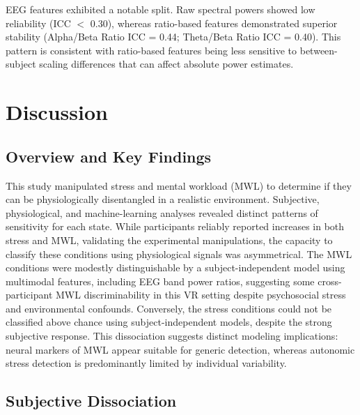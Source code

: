 \documentclass[lettersize,journal]{IEEEtran}
\begin{document}
EEG features exhibited a notable split. Raw spectral powers showed low reliability (ICC $<$ 0.30), whereas ratio-based features demonstrated superior stability (Alpha/Beta Ratio ICC = 0.44; Theta/Beta Ratio ICC = 0.40). This pattern is consistent with ratio-based features being less sensitive to between-subject scaling differences that can affect absolute power estimates.


\section{Discussion}

\subsection{Overview and Key Findings}

This study manipulated stress and mental workload (MWL) to determine if they can be physiologically disentangled in a realistic environment. Subjective, physiological, and machine-learning analyses revealed distinct patterns of sensitivity for each state. While participants reliably reported increases in both stress and MWL, validating the experimental manipulations, the capacity to classify these conditions using physiological signals was asymmetrical. The MWL conditions were modestly distinguishable by a subject-independent model using multimodal features, including EEG band power ratios, suggesting some cross-participant MWL discriminability in this VR setting despite psychosocial stress and environmental confounds. Conversely, the stress conditions could not be classified above chance using subject-independent models, despite the strong subjective response. This dissociation suggests distinct modeling implications: neural markers of MWL appear suitable for generic detection, whereas autonomic stress detection is predominantly limited by individual variability.


\subsection{Subjective Dissociation}
\end{document}
